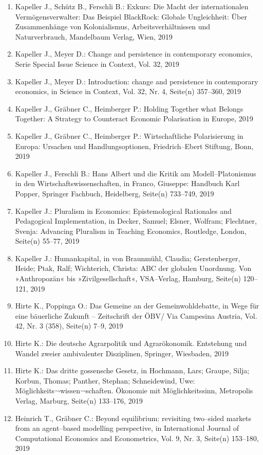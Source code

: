 \begin{enumerate}
	 \item Kapeller J., Schütz B., Ferschli B.: Exkurs: Die Macht der internationalen Vermögensverwalter: Das Beispiel BlackRock: Globale Ungleichheit: Über Zusammenhänge von Kolonialismus, Arbeitsverhältnissen und Naturverbrauch, Mandelbaum Verlag, Wien, 2019
	 \item Kapeller J., Meyer D.: Change and persistence in contemporary economics, Serie Special Issue Science in Context, Vol. 32, 2019
	 \item Kapeller J., Meyer D.: Introduction: change and persistence in contemporary economics, in Science in Context, Vol. 32, Nr. 4, Seite(n) 357--360, 2019
	 \item Kapeller J., Gräbner C., Heimberger P.: Holding Together what Belongs Together: A Strategy to Counteract Economic Polarisation in Europe, 2019
	 \item Kapeller J., Gräbner C., Heimberger P.: Wirtschaftliche Polarisierung in Europa: Ursachen und Handlungsoptionen, Friedrich--Ebert Stiftung, Bonn, 2019
	 \item Kapeller J., Ferschli B.: Hans Albert und die Kritik am Modell--Platonismus in den Wirtschaftswissenschaften, in Franco, Giuseppe: Handbuch Karl Popper, Springer Fachbuch, Heidelberg, Seite(n) 733--749, 2019
	 \item Kapeller J.: Pluralism in Economics: Epistemological Rationales and Pedagogical Implementation, in Decker, Samuel; Elsner, Wolfram; Flechtner, Svenja: Advancing Pluralism in Teaching Economics, Routledge, London, Seite(n) 55--77, 2019
	 \item Kapeller J.: Humankapital, in von Braunmühl, Claudia; Gerstenberger, Heide; Ptak, Ralf; Wichterich, Christa: ABC der globalen Unordnung. Von »Anthropozän« bis »Zivilgesellschaft«, VSA--Verlag, Hamburg, Seite(n) 120--121, 2019
	 \item Hirte K., Poppinga O.: Das Gemeine an der Gemeinwohldebatte, in Wege für eine bäuerliche Zukunft – Zeitschrift der ÖBV/ Via Campesina Austria, Vol. 42, Nr. 3 (358), Seite(n) 7--9, 2019
	 \item Hirte K.: Die deutsche Agrarpolitik und Agrarökonomik. Entstehung und Wandel zweier ambivalenter Disziplinen, Springer, Wiesbaden, 2019
	 \item Hirte K.: Das dritte gossensche Gesetz, in Hochmann, Lars; Graupe, Silja; Korbun, Thomas; Panther, Stephan; Schneidewind, Uwe: Möglichkeits¬wissen¬schaften. Ökonomie mit Möglichkeitssinn, Metropolis Verlag, Marburg, Seite(n) 133--176, 2019
	 \item Heinrich T., Gräbner C.: Beyond equilibrium: revisiting two--sided markets from an agent--based modelling perspective, in International Journal of Computational Economics and Econometrics, Vol. 9, Nr. 3, Seite(n) 153--180, 2019

\end{enumerate}
